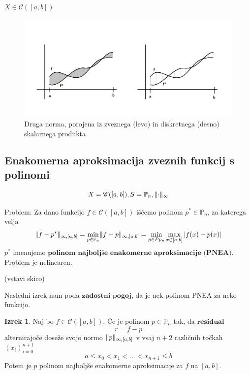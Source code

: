 \documentclass[a4paper,12pt]{article}
\DeclarePairedDelimiter\norm{\lVert}{\rVert}
\theoremstyle{definition}
\newtheorem{theorem}[counter]{Izrek}
\theoremstyle{remark}
\newcommand{\Pp}{\mathbb{P}}
\begin{document}
$X \in \mathscr{C}([a, b])$
\begin{figure}[h]
    \center
    \includegraphics[scale=0.25]{mnk_tretja.png}
    \caption{Druga norma, porojena iz zveznega (levo) in diskretnega (desno) skalarnega produkta}
\end{figure}

\subsection{Enakomerna aproksimacija zveznih funkcij s polinomi}
\begin{equation*}
    X = \mathscr{C} ([a, b]), S = \Pp_n, \norm{\cdot}_{\infty}
\end{equation*}

Problem: Za dano funkcijo $f \in \mathscr{C} ([a, b])$ iščemo polinom $p^* \in \Pp_n$, za katerega velja
\begin{equation*}
    \norm{f - p^*}_{\infty, [a, b]} = \min_{p \in \Pp_n} \norm{f - p}_{\infty, [a, b]} = \min_{p \in Pp_n} \max_{x \in [a, b]} \left| f(x) - p(x) \right|
\end{equation*}
$p^*$ imenujemo $\textbf{polinom najboljše enakomerne aproksimacije (PNEA)}$.
Problem je nelinearen.

(vstavi skico)

Nasledni izrek nam poda $\textbf{zadostni pogoj}$, da je nek polinom PNEA za neko funkcijo.
\begin{theorem}
    Naj bo $f \in \mathscr{C}([a, b])$. Če je polinom $p \in \Pp_n$ tak, da $\textbf{residual}$
    \begin{equation}
        r = f - p
    \end{equation}
    alternirajoče doseže svojo normo $\norm{p}_{\infty, [a, b]}$ v vsaj $n + 2$ različnih točkah $(x_i)_{i=0}^{n+1}$
    \[a \leq x_0 < x_1 < \dots < x_{n+1} \leq b\]
    Potem je $p$ polinom najboljše enakomerne aproksimacije za $f$ na $[a, b]$.
\end{theorem}
\end{document}
